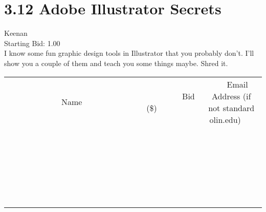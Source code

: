 \documentclass[11pt]{article}
\begin{document}
					\section*{3.12 Adobe Illustrator Secrets}
					Keenan \\
					Starting Bid: 1.00 \\
					I know some fun graphic design tools in Illustrator that you probably don't. I'll show you a couple of them and teach you some things maybe. Shred it. \\
					[6ex]
					\begin{tabular}{c c c}
						~~~~~~~~~~~~~Name~~~~~~~~~~~~~ & ~~~~~~~~~Bid (\$)~~~~~~~~~ & ~~~Email Address (if not standard olin.edu)~~~ \\
				
 & & \\
\hline
 & & \\
\hline
 & & \\
\hline
 & & \\
\hline
 & & \\
\hline
 & & \\
\hline
 & & \\
\hline
 & & \\
\hline
 & & \\
\hline
 & & \\
\hline
 & & \\
\hline
 & & \\
\hline
 & & \\
\hline
 & & \\
\hline
 & & \\
\hline
 & & \\
\hline
 & & \\
\hline
 & & \\
\hline
 & & \\
\hline
 & & \\
\hline
 & & \\
\hline
 & & \\
\hline
 & & \\
\hline
 & & \\
\hline
 & & \\
\hline
 & & \\
\hline
					\end{tabular}
					\clearpage
				
\end{document}

